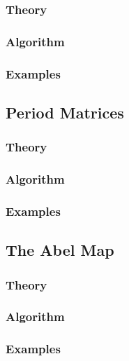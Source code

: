 \documentclass[10pt,twoside]{article}
\theoremstyle{plain}
\theoremstyle{definition}
\numberwithin{equation}{section}
\begin{document}
%
\subsubsection*{Theory}
%
%
\subsubsection*{Algorithm}
%
%
\subsubsection*{Examples}
%

\subsection{Period Matrices}

%
\subsubsection*{Theory}
%
%
\subsubsection*{Algorithm}
%
%
\subsubsection*{Examples}
%

\subsection{The Abel Map}

%
\subsubsection*{Theory}
%
%
\subsubsection*{Algorithm}
%
%
\subsubsection*{Examples}
%
\end{document}
